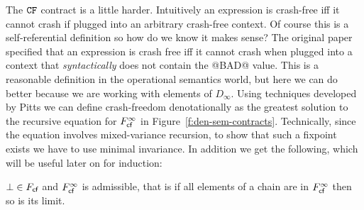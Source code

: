 The ${\tt CF}$ contract is a little harder. Intuitively an expression is crash-free iff it cannot
crash if plugged into an arbitrary crash-free context. Of course this is a
self-referential definition so how do we know it makes sense? The original paper
\cite{xu+:contracts} specified that an expression is crash free iff it
cannot crash when plugged into a context that {\em syntactically} does not contain the
@BAD@ value. This is a reasonable definition in the operational semantics world, but
here we can do better because we are working with elements of $D_\infty$. Using
techniques developed by Pitts we can define crash-freedom denotationally as the greatest solution
to the recursive equation for $F_{\textsf{cf}}^{\infty}$ in Figure~\ref{f:den-sem-contracts}. Technically,
since the equation involves mixed-variance recursion, to show that such a fixpoint exists we have
to use minimal invariance.
In addition we get the following, which will be useful later on for induction:
\begin{lemma}\label{lem:cf-admissible}
$\bot \in F_{\textsf{cf}}$ and $F_{\textsf{cf}}^{\infty}$ is admissible, that is if all elements of a chain are in
$F_{\textsf{cf}}^{\infty}$ then so is its limit.
\end{lemma}


